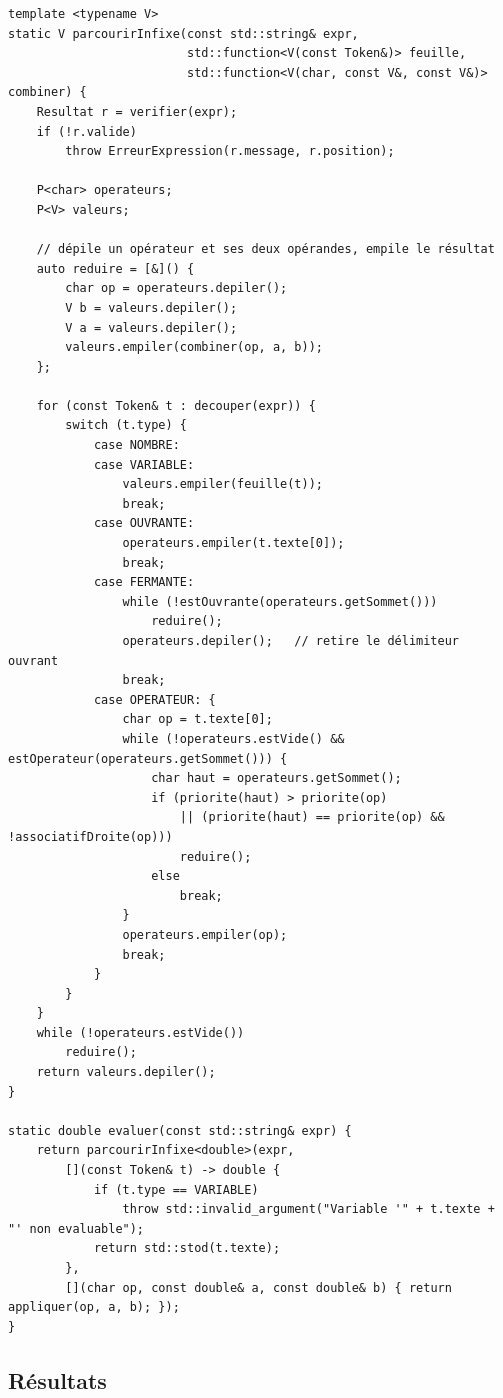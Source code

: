 \documentclass[11pt,a4paper]{article}
\begin{document}
\begin{lstlisting}[caption={Parcours générique d'une expression infixe}]
template <typename V>
static V parcourirInfixe(const std::string& expr,
                         std::function<V(const Token&)> feuille,
                         std::function<V(char, const V&, const V&)> combiner) {
    Resultat r = verifier(expr);
    if (!r.valide)
        throw ErreurExpression(r.message, r.position);

    P<char> operateurs;
    P<V> valeurs;

    // dépile un opérateur et ses deux opérandes, empile le résultat
    auto reduire = [&]() {
        char op = operateurs.depiler();
        V b = valeurs.depiler();
        V a = valeurs.depiler();
        valeurs.empiler(combiner(op, a, b));
    };

    for (const Token& t : decouper(expr)) {
        switch (t.type) {
            case NOMBRE:
            case VARIABLE:
                valeurs.empiler(feuille(t));
                break;
            case OUVRANTE:
                operateurs.empiler(t.texte[0]);
                break;
            case FERMANTE:
                while (!estOuvrante(operateurs.getSommet()))
                    reduire();
                operateurs.depiler();   // retire le délimiteur ouvrant
                break;
            case OPERATEUR: {
                char op = t.texte[0];
                while (!operateurs.estVide() && estOperateur(operateurs.getSommet())) {
                    char haut = operateurs.getSommet();
                    if (priorite(haut) > priorite(op)
                        || (priorite(haut) == priorite(op) && !associatifDroite(op)))
                        reduire();
                    else
                        break;
                }
                operateurs.empiler(op);
                break;
            }
        }
    }
    while (!operateurs.estVide())
        reduire();
    return valeurs.depiler();
}

static double evaluer(const std::string& expr) {
    return parcourirInfixe<double>(expr,
        [](const Token& t) -> double {
            if (t.type == VARIABLE)
                throw std::invalid_argument("Variable '" + t.texte + "' non evaluable");
            return std::stod(t.texte);
        },
        [](char op, const double& a, const double& b) { return appliquer(op, a, b); });
}
\end{lstlisting}

\subsection{Résultats}
\end{document}
